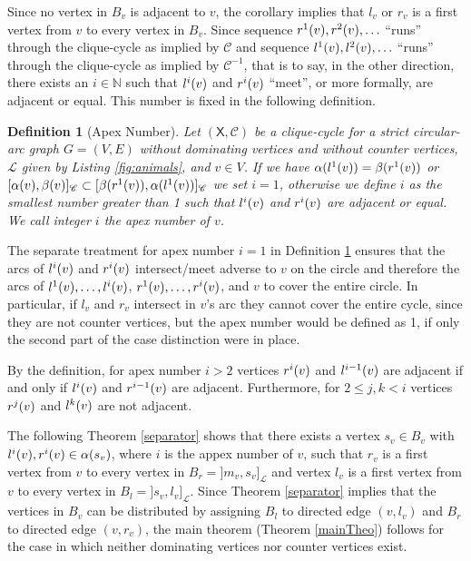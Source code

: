\documentclass[10pt]{article}
\newtheorem{definition}[theorem]{Definition}
\newcommand{\q}[1]{``#1''}\newcommand{\fu}[1]{\mathcal{#1}}\newcommand{\mc}[1]{\mathsf{#1}}\newcommand{\ri}[1]{\mathscr{#1}}\newcommand{\co}[1]{\fu{C}({#1})}\newcommand{\lc}[1]{\alpha(#1)}\newcommand{\rc}[1]{\beta(#1)}\newcommand{\ema}[1]{\mathcal{#1}}\newcommand{\fe}[2]{\fu{F}(#1,#2)}\newcommand{\lv}[1]{l_{#1}}\newcommand{\rv}[1]{r_{#1}}\newcommand{\mv}[1]{m_{#1}}\newcommand{\lvv}{\lv{v}}
\newcommand{\rvv}{\rv{v}}
\newcommand{\mvv}{\mv{v}}
\newcommand{\svv}{s_v}
\begin{document}
Since no vertex in $B_v$ is adjacent to $v$, the corollary implies that $\lvv$ or $\rvv$ is a 
first vertex from $v$ to every vertex in $B_v$.
Since sequence 
$\rvi{v}{1},\rvi{v}{2},\ldots$ \q{runs} through the clique-cycle as 
implied by $\ri{C}$ and sequence 
$\lvi{v}{1},\lvi{v}{2},\ldots$ \q{runs} through the clique-cycle as 
implied by $\ri{C}^{-1}$, that is to say, in the other direction, 
there exists an $i\in\mathbb{N}$ such that $\lvi{v}{i}$ and $\rvi{v}{i}$ \q{meet}, 
or more formally, are adjacent or equal. 
This number is fixed in the following definition. 



\begin{definition}[Apex Number]\label{apex}
Let $(\mc{X},\ri{C})$ be a clique-cycle for a strict cir\-cular-arc graph $G=(V,E)$ 
without dominating vertices and without counter vertices, 
$\ri{L}$ given by Listing \ref{fig:animals}, and $v\in V$.
If we have $\lc{\lvi{v}{1}}=\rc{\rvi{v}{1}}$ or 
$[\lc{v},\rc{v}]_\ri{C}\subset[\rc{\rvi{v}{1}},\lc{\lvi{v}{1}}]_\ri{C}$ 
we set $i=1$, 
otherwise we define $i$ as the smallest number greater than 1 
such that $\lvi{v}{i}$ and $\rvi{v}{i}$ are adjacent or equal.
We call integer $i$ the \emph{apex number of $v$}.
\end{definition}


The separate treatment for apex number $i=1$ in Definition \ref{apex} ensures that the 
arcs of $\lvi{v}{i}$ and $\rvi{v}{i}$ intersect/meet adverse to $v$ on the 
circle and therefore the arcs of $\lvi{v}{1},\ldots,\lvi{v}{i}$, $\rvi{v}{1},\ldots,\rvi{v}{i}$,
and $v$ to cover the entire circle.
In particular, if $\lvv$ and $\rvv$ intersect in $v$'s arc they cannot 
cover the entire cycle, since they are not counter vertices, but the apex 
number would be defined as 1, if only the second part of the case distinction were in place.






By the definition, for apex number $i>2$ vertices $\rvi{v}{i}$ and $\lvi{v}{i-1}$ are 
adjacent if and only if $\lvi{v}{i}$ and $\rvi{v}{i-1}$ are adjacent.
Furthermore, for $2\leq j,k < i$ vertices $\rvi{v}{j}$ and $\lvi{v}{k}$ are not adjacent.

The following Theorem \ref{separator} shows that there 
exists a vertex $\svv\in B_v$ with $\lvi{v}{i},\rvi{v}{i}\in\lc{\svv}$, where $i$ is 
the appex number of $v$, such that $\rvv$ is a 
first vertex from $v$ to every vertex in $B_r=]\mvv,\svv]_\ri{L}$ and vertex $\lvv$ is a 
first vertex from $v$ to every vertex in $B_l=]\svv,\lvv]_\ri{L}$. 
Since Theorem \ref{separator} implies that the vertices in $B_v$ can be distributed 
by assigning $B_l$ to directed edge $(v,\lvv)$ and $B_r$ to directed edge $(v,\rvv)$, the main theorem 
(Theorem \ref{mainTheo}) 
follows for the case in which neither dominating vertices nor counter vertices exist.
\end{document}

